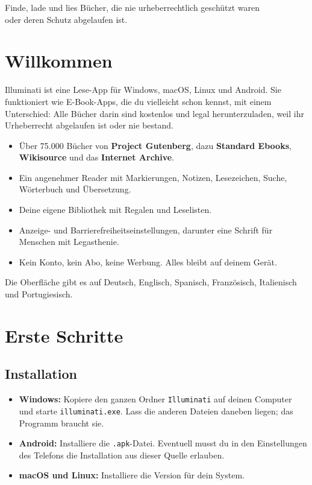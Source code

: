 \documentclass[11pt]{article}
\begin{document}
%
  {Finde, lade und lies Bücher, die nie urheberrechtlich geschützt waren\\oder deren Schutz abgelaufen ist.}

{\setcounter{tocdepth}{1}\tableofcontents}
\newpage

\section{Willkommen}

Illuminati ist eine Lese-App für Windows, macOS, Linux und Android. Sie funktioniert wie
E-Book-Apps, die du vielleicht schon kennst, mit einem Unterschied: Alle Bücher darin sind
kostenlos und legal herunterzuladen, weil ihr Urheberrecht abgelaufen ist oder nie bestand.

\begin{itemize}
  \item Über 75.000 Bücher von \textbf{Project Gutenberg}, dazu \textbf{Standard Ebooks},
        \textbf{Wikisource} und das \textbf{Internet Archive}.
  \item Ein angenehmer Reader mit Markierungen, Notizen, Lesezeichen, Suche, Wörterbuch und
        Übersetzung.
  \item Deine eigene Bibliothek mit Regalen und Leselisten.
  \item Anzeige- und Barrierefreiheitseinstellungen, darunter eine Schrift für Menschen mit
        Legasthenie.
  \item Kein Konto, kein Abo, keine Werbung. Alles bleibt auf deinem Gerät.
\end{itemize}

Die Oberfläche gibt es auf Deutsch, Englisch, Spanisch, Französisch, Italienisch und
Portugiesisch.

\section{Erste Schritte}

\subsection{Installation}
\begin{itemize}
  \item \textbf{Windows:} Kopiere den ganzen Ordner \texttt{Illuminati} auf deinen Computer und
        starte \texttt{illuminati.exe}. Lass die anderen Dateien daneben liegen; das Programm
        braucht sie.
  \item \textbf{Android:} Installiere die \texttt{.apk}-Datei. Eventuell musst du in den
        Einstellungen des Telefons die Installation aus dieser Quelle erlauben.
  \item \textbf{macOS und Linux:} Installiere die Version für dein System.
\end{itemize}
\end{document}
